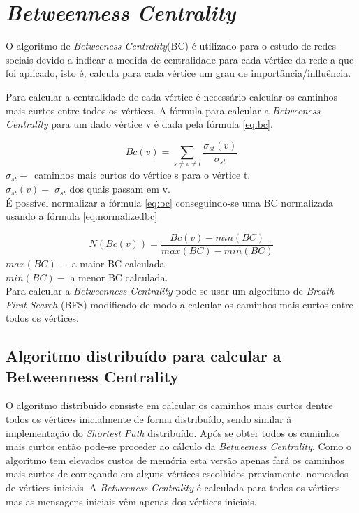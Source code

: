 \section{\textit{Betweenness Centrality}}

O algoritmo de \textit{Betweeness Centrality}(BC) é utilizado para o 
estudo de redes sociais devido a indicar a medida de centralidade para cada 
vértice da rede a que foi aplicado, isto é, calcula para cada vértice um grau de 
importância/influência. 

Para calcular a centralidade de cada vértice é necessário calcular os 
caminhos mais curtos entre todos os vértices. A fórmula para calcular a 
\textit{Betweeness Centrality} para um dado vértice v é dada pela fórmula 
\ref{eq:bc}.

\begin{equation}
	Bc(v) = \sum\limits_{s \neq v \neq t} 
\frac{\sigma_{st}(v)}{\sigma_{st}}
	\label{eq:bc}
\end{equation}
$\sigma_{st}-$~caminhos mais curtos do vértice s para o vértice t.\\
$\sigma_{st}(v)-$ $\sigma_{st}$ dos quais passam em v.\\

É possível normalizar a  fórmula \ref{eq:bc} conseguindo-se uma BC normalizada usando a fórmula 
\ref{eq:normalizedbc}

\begin{equation}
	N(Bc(v)) = \frac{Bc(v) - min(BC)}{max(BC)-min(BC)} 
	\label{eq:normalizedbc}
\end{equation}
$max(BC)-$ a maior BC calculada.\\
$min(BC)-$ a menor BC calculada.\\

Para calcular a \textit{Betweenness Centrality} pode-se usar um algoritmo de 
\textit{Breath First Search} (BFS) modificado de modo a calcular os caminhos 
mais curtos entre todos os vértices. 

\subsection{Algoritmo distribuído para calcular a Betweenness Centrality}
O algoritmo distribuído consiste em calcular os caminhos mais curtos dentre todos os vértices inicialmente de forma distribuído, sendo similar à implementação do 
\textit{Shortest Path} distribuído. Após se obter todos os caminhos mais curtos 
então pode-se proceder ao cálculo da \textit{Betweeness Centrality}. Como o algoritmo tem elevados custos de memória esta versão apenas fará os caminhos mais curtos de começando em alguns vértices escolhidos previamente, nomeados de vértices iniciais. A \textit{Betweeness Centrality} é calculada para todos os vértices mas as mensagens iniciais vêm apenas dos vértices iniciais.
 
